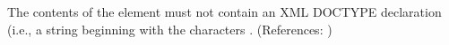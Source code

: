 The contents of the  element must not contain an XML
DOCTYPE declaration (i.e., a string beginning with the characters
.  (References: )
